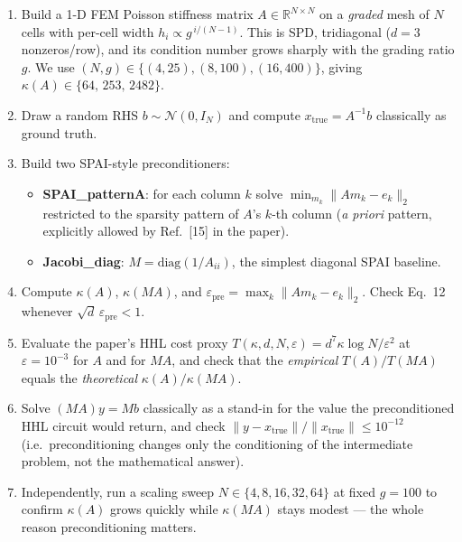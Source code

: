 \documentclass[11pt]{article}
\begin{document}
\begin{enumerate}
  \item Build a 1-D FEM Poisson stiffness matrix $A \in \mathbb{R}^{N\times N}$
        on a \emph{graded} mesh of $N$ cells with per-cell width
        $h_i \propto g^{\,i/(N-1)}$. This is SPD, tridiagonal
        ($d=3$ nonzeros/row), and its condition number grows sharply with
        the grading ratio $g$. We use $(N,g)\in\{(4,25),(8,100),(16,400)\}$,
        giving $\kappa(A)\in\{64,\,253,\,2482\}$.
  \item Draw a random RHS $b\sim\mathcal N(0,I_N)$ and compute
        $x_{\text{true}}=A^{-1}b$ classically as ground truth.
  \item Build two SPAI-style preconditioners:
        \begin{itemize}
          \item \textbf{SPAI\_patternA}: for each column $k$ solve
                $\min_{m_k}\|A m_k - e_k\|_2$ restricted to the sparsity
                pattern of $A$'s $k$-th column (\emph{a priori} pattern,
                explicitly allowed by Ref.~[15] in the paper).
          \item \textbf{Jacobi\_diag}: $M=\mathrm{diag}(1/A_{ii})$, the
                simplest diagonal SPAI baseline.
        \end{itemize}
  \item Compute $\kappa(A)$, $\kappa(MA)$, and
        $\varepsilon_{\mathrm{pre}} = \max_k \|A m_k - e_k\|_2$.
        Check Eq.~12 whenever $\sqrt d\,\varepsilon_{\mathrm{pre}}<1$.
  \item Evaluate the paper's HHL cost proxy
        $T(\kappa,d,N,\varepsilon) = d^{7}\kappa \log N / \varepsilon^{2}$
        at $\varepsilon = 10^{-3}$ for $A$ and for $MA$, and check that the
        \emph{empirical} $T(A)/T(MA)$ equals the \emph{theoretical}
        $\kappa(A)/\kappa(MA)$.
  \item Solve $(MA) y = Mb$ classically as a stand-in for the value the
        preconditioned HHL circuit would return, and check
        $\|y-x_{\text{true}}\|/\|x_{\text{true}}\| \le 10^{-12}$ (i.e.\
        preconditioning changes only the conditioning of the intermediate
        problem, not the mathematical answer).
  \item Independently, run a scaling sweep $N\in\{4,8,16,32,64\}$ at fixed
        $g=100$ to confirm $\kappa(A)$ grows quickly while $\kappa(MA)$ stays
        modest --- the whole reason preconditioning matters.
\end{enumerate}
\end{document}
